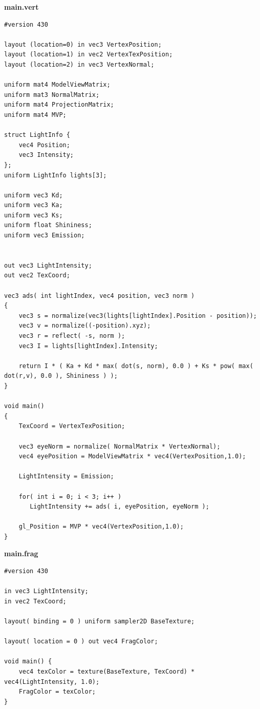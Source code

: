 \documentclass[a4paper,14pt]{extarticle}
\begin{document}
\textbf{main.vert}
\begin{verbatim}
#version 430

layout (location=0) in vec3 VertexPosition;
layout (location=1) in vec2 VertexTexPosition;
layout (location=2) in vec3 VertexNormal;

uniform mat4 ModelViewMatrix;   
uniform mat3 NormalMatrix;   
uniform mat4 ProjectionMatrix;      
uniform mat4 MVP;     

struct LightInfo {
    vec4 Position;
    vec3 Intensity;
};
uniform LightInfo lights[3];

uniform vec3 Kd;      
uniform vec3 Ka;      
uniform vec3 Ks;       
uniform float Shininess;
uniform vec3 Emission;


out vec3 LightIntensity;
out vec2 TexCoord;

vec3 ads( int lightIndex, vec4 position, vec3 norm )
{
    vec3 s = normalize(vec3(lights[lightIndex].Position - position));
    vec3 v = normalize((-position).xyz);
    vec3 r = reflect( -s, norm );
    vec3 I = lights[lightIndex].Intensity;

    return I * ( Ka + Kd * max( dot(s, norm), 0.0 ) + Ks * pow( max( dot(r,v), 0.0 ), Shininess ) );
}

void main()
{
    TexCoord = VertexTexPosition;

	vec3 eyeNorm = normalize( NormalMatrix * VertexNormal);
    vec4 eyePosition = ModelViewMatrix * vec4(VertexPosition,1.0);

    LightIntensity = Emission;

    for( int i = 0; i < 3; i++ )
       LightIntensity += ads( i, eyePosition, eyeNorm );
   
    gl_Position = MVP * vec4(VertexPosition,1.0);
}

\end{verbatim}

\textbf{main.frag}
\begin{verbatim}
#version 430

in vec3 LightIntensity;
in vec2 TexCoord;

layout( binding = 0 ) uniform sampler2D BaseTexture;

layout( location = 0 ) out vec4 FragColor;

void main() {
    vec4 texColor = texture(BaseTexture, TexCoord) * vec4(LightIntensity, 1.0);
	FragColor = texColor;
}

\end{verbatim}
\end{document}
